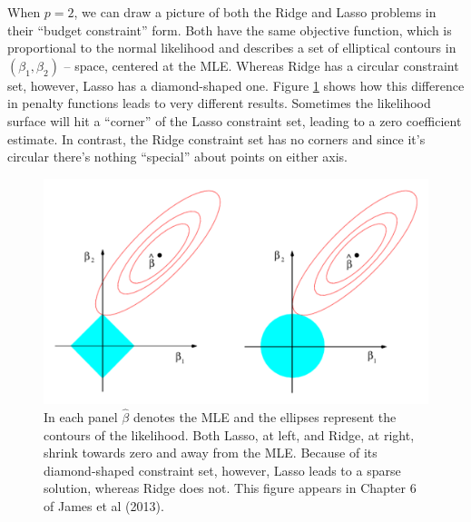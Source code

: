 \documentclass[12pt]{article}
\theoremstyle{definition}
\begin{document}
When $p=2$, we can draw a picture of both the Ridge and Lasso problems in their ``budget constraint'' form. Both have the same objective function, which is proportional to the normal likelihood and describes a set of elliptical contours in $(\beta_1,\beta_2)$ -- space, centered at the MLE. Whereas Ridge has a circular constraint set, however, Lasso has a diamond-shaped one. Figure \ref{fig:ridge_lasso_constraint} shows how this difference in penalty functions leads to very different results. Sometimes the likelihood surface will hit a ``corner'' of the Lasso constraint set, leading to a zero coefficient estimate. In contrast, the Ridge constraint set has no corners and since it's circular there's nothing ``special'' about points on either axis.

\begin{figure}
	\centering
	\includegraphics[scale=0.6]{ISLR_ch6_fig7}
	\caption{In each panel $\widehat{\beta}$ denotes the MLE and the ellipses represent the contours of the likelihood. Both Lasso, at left, and Ridge, at right, shrink towards zero and away from the MLE. Because of its diamond-shaped constraint set, however, Lasso leads to a sparse solution, whereas Ridge does not. This figure appears in Chapter 6 of James et al (2013).}
	\label{fig:ridge_lasso_constraint}
\end{figure}
\end{document}
